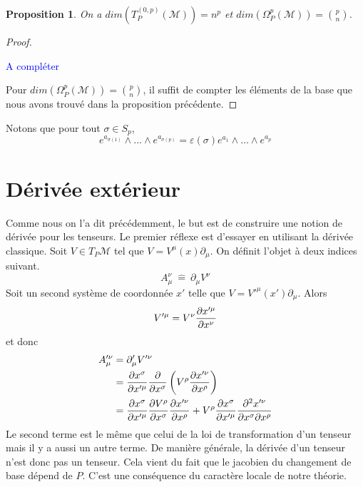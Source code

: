 \documentclass[a4paper,11pt]{report}
\theoremstyle{definition}
\theoremstyle{plain}
\newtheorem{prop}[thm]{Proposition}
\theoremstyle{definition}
\theoremstyle{remark}
\newcommand{\comp}{\begin{center}\textcolor{blue}{A compléter}\end{center}}
\newcommand{\M}{\mathscr{M}}
\newcommand{\p}{\partial}
\begin{document}
            \begin{prop}
                On a $dim(T_P^{(0,p)}(\M)) = n^p$ et $dim(\Omega_P^p(\M)) = {p \choose n}$.
            \end{prop}
            
            \begin{proof}${}$\\
                 \comp
                 Pour $dim(\Omega_P^p(\M)) = {p \choose n}$, il suffit de compter les éléments de la base que nous avons trouvé dans la proposition précédente.
            \end{proof}
            
            Notons que pour tout $\sigma\in S_p$,
            \begin{equation}
                e^{a_{\sigma(1)}}\wedge\dots\wedge e^{a_{\sigma(p)}} = \varepsilon(\sigma)e^{a_1}\wedge\dots \wedge e^{a_p}
            \end{equation}
        
        \section{Dérivée extérieur}
        
            Comme nous on l'a dit précédemment, le but est de construire une notion de dérivée pour les tenseurs. Le premier réflexe est d'essayer en utilisant la dérivée classique. Soit $V\in T_P\M$ tel que $V = V^\mu(x) \p_\mu$. On définit l'objet à deux indices suivant.
            \begin{equation}
                A_\mu^\nu ~\hat{=}~ \p_\mu V^\nu
            \end{equation}
            Soit un second système de coordonnée $x'$ telle que $V = V'^\mu(x') \p_\mu$. Alors 
            \begin{equation}
                V'^\mu = V^\nu \pdv{x'^\mu}{x^\nu}
            \end{equation}
            et donc
            \begin{align}
                A'^\nu_\mu &= \p'_\mu V'^\nu \\
                &= \pdv{x^\sigma}{x'^\mu}\pdv{}{x^\sigma}\left( V^\rho \pdv{x'^\nu}{x^\rho} \right)\\
                &= \pdv{x^\sigma}{x'^\mu}\pdv{V^\rho}{x^\sigma}\pdv{x'^\nu}{x^\rho}+V^\rho\pdv{x^\sigma}{x'^\mu}  \pdv{x'^\nu}{x^\sigma}{x^\rho}
            \end{align}
            Le second terme est le même que celui de la loi de transformation d'un tenseur mais il y a aussi un autre terme. De manière générale, la dérivée d'un tenseur n'est donc pas un tenseur. Cela vient du fait que le jacobien du changement de base dépend de $P$. C'est une conséquence du caractère locale de notre théorie.
            
\end{document}
